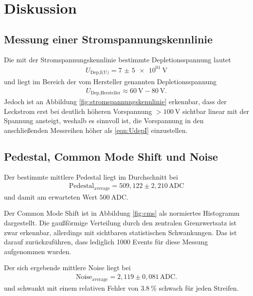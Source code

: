 \section{Diskussion}
\label{sec:Diskussion}

\subsection{Messung einer Stromspannungskennlinie}

Die mit der Stromspannungskennlinie bestimmte Depletionsspannung lautet
\begin{align}
  U_\text{Dep,I(U)} = \SI{7(5)e01}{\volt}
  \label{eqn:UdepI}
\end{align}
und liegt im Bereich der vom Hersteller genannten Depletionsspannung
\begin{align}
  U_\text{Dep,Hersteller} \approx \SI{60}{\volt} - \SI{80}{\volt}.
\end{align}
Jedoch ist an Abbildung \ref{fig:stromspannungskennlinie} erkennbar, dass
der Leckstrom erst bei deutlich höheren Vorspannung $> \SI{100}{\volt}$ sichtbar
linear mit der Spannung ansteigt, weshalb es sinnvoll ist, die Vorspannung in den
anschließenden Messreihen höher als \eqref{eqn:UdepI} einzustellen.

\subsection{Pedestal, Common Mode Shift und Noise}

Der bestimmte mittlere Pedestal liegt im Durchschnitt bei
\begin{align}
  \text{Pedestal}_\text{average} = 509,122 \pm 2,210 \, \text{ADC}
\end{align}
und damit am erwarteten Wert $\SI{500}{\text{ADC}}$.

Der Common Mode Shift ist in Abbildung \ref{fig:cms} als normiertes Histogramm dargestellt.
Die gaußförmige Verteilung durch den zentralen Grenzwertsatz ist zwar erkennbar, allerdings
mit sichtbaren statistischen Schwankungen. Das ist darauf zurückzuführen, dass lediglich
1000 Events für diese Messung aufgenommen wurden.

Der sich ergebende mittlere Noise liegt bei
\begin{align}
  \text{Noise}_\text{average} = 2,119 \pm 0,081 \, \text{ADC}.
  \label{eqn:noise}
\end{align}
und schwankt mit einem relativen Fehler von $\SI{3.8}{\percent}$ schwach für
jeden Streifen.

